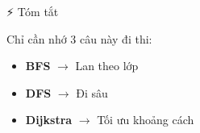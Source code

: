 \documentclass[11pt]{beamer}
\begin{document}
\begin{frame}{⚡ Tóm tắt }
    \begin{exampleblock}{Chỉ cần nhớ 3 câu này đi thi:}
        \vspace{0.3cm}
        \large
        \begin{itemize}
            \item \textbf{BFS} $\rightarrow$ Lan theo lớp
            \vspace{0.2cm}
            \item \textbf{DFS} $\rightarrow$ Đi sâu
            \vspace{0.2cm}
            \item \textbf{Dijkstra} $\rightarrow$ Tối ưu khoảng cách
        \end{itemize}
        \vspace{0.3cm}
    \end{exampleblock}
\end{frame}
\end{document}
